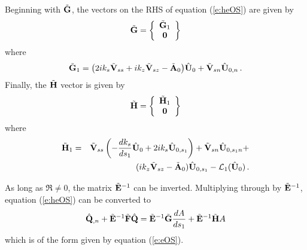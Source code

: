 Beginning with $\tilde{{\bf G}}$, the vectors on the RHS of equation (\ref{e:heOS})
are given by
%
\begin{equation}
  \tilde{{\bf G}} = \left\{ \begin{array}{c} 
                     \tilde{{\bf G}}_{1} \\
                     {\bf 0}
                   \end{array}
            \right\} 
\end{equation}
%
where
%
\begin{equation}
  \tilde{{\bf G}}_{1} = \bigl(2 i k_s {\tilde {\bf V}}_{ss} + 
                  i k_z {\tilde {\bf V}}_{sz} - \tilde{{\bf A}}_0 \bigr) {\hat{\bf U}}_0 + 
                  {\tilde {\bf V}}_{sn} {\hat{\bf U}}_{0,n} {\, .}
\end{equation}
%
Finally, the $\tilde{{\bf H}}$ vector is given by
%
\begin{equation}
  \tilde{{\bf H}} = \left\{ \begin{array}{c} 
                     \tilde{{\bf H}}_{1} \\
                     {\bf 0}
                   \end{array}
            \right\}
\end{equation}
%
where
%
\begin{eqnarray}
  \tilde{{\bf H}}_{1} &=& {\tilde {\bf V}}_{ss}\left( - \frac{dk_s}{ds_1} {\hat{\bf U}}_0 + 
                    2 i k_s {\hat{\bf U}}_{0,s_1} \right) + 
                    {\tilde {\bf V}}_{sn} {\hat{\bf U}}_{0,s_1 n} + 
  \nonumber\\
                & & (i k_z {\tilde {\bf V}}_{sz} - 
                    \tilde{{\bf A}}_0) {\hat{\bf U}}_{0,s_1} - {\cal L}_1({\hat{\bf U}}_0) {\, .}
\end{eqnarray}

As long as $\Re \ne 0$, the matrix $\tilde{{\bf E}}^{-1}$ can be inverted.
Multiplying through by $\tilde{{\bf E}}^{-1}$, equation (\ref{e:heOS}) can be
converted to
%
\begin{equation}
  {\hat{\bf Q}}_{,n} + \tilde{{\bf E}}^{-1} \tilde{{\bf F}} {\hat{\bf Q}} = \tilde{{\bf E}}^{-1} \tilde{{\bf G}} 
  \frac{dA}{ds_1} + \tilde{{\bf E}}^{-1}\tilde{{\bf H}} A
\end{equation}
%
which is of the form given by equation (\ref{e:eOS}).